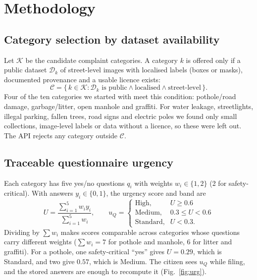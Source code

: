 \documentclass[conference]{IEEEtran}
\begin{document}
\section{Methodology}\label{sec:method}

\subsection{Category selection by dataset availability}
Let $\mathcal{K}$ be the candidate complaint categories. A category $k$ is offered only if a public dataset $\mathcal{D}_k$ of street-level images with localised labels (boxes or masks), documented provenance and a usable licence exists:
\begin{equation}
\mathcal{C}=\{\,k\in\mathcal{K} : \mathcal{D}_k \text{ is public} \wedge \text{localised} \wedge \text{street-level}\,\}.
\label{eq:gate}
\end{equation}
Four of the ten categories we started with meet this condition: pothole/road damage, garbage/litter, open manhole and graffiti. For water leakage, streetlights, illegal parking, fallen trees, road signs and electric poles we found only small collections, image-level labels or data without a licence, so these were left out. The API rejects any category outside $\mathcal{C}$.

\subsection{Traceable questionnaire urgency}
Each category has five yes/no questions $q_i$ with weights $w_i\in\{1,2\}$ (2 for safety-critical). With answers $y_i\in\{0,1\}$, the urgency score and band are
\begin{equation}
U=\frac{\sum_{i=1}^{5} w_i y_i}{\sum_{i=1}^{5} w_i},\qquad
u_Q=\begin{cases}\text{High}, & U\ge 0.6\\ \text{Medium}, & 0.3\le U<0.6\\ \text{Standard}, & U<0.3.\end{cases}
\label{eq:urg}
\end{equation}
Dividing by $\sum w_i$ makes scores comparable across categories whose questions carry different weights ($\sum w_i=7$ for pothole and manhole, 6 for litter and graffiti). For a pothole, one safety-critical ``yes'' gives $U=0.29$, which is Standard, and two give $0.57$, which is Medium. The citizen sees $u_Q$ while filing, and the stored answers are enough to recompute it (Fig.~\ref{fig:urg}).
\end{document}

